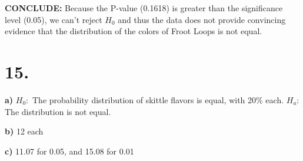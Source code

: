 \documentclass{article}
\begin{document}
\noindent\textbf{CONCLUDE:} Because the P-value (0.1618) is greater than the significance level (0.05), we can't reject $H_0$ and thus the data does not provide convincing evidence that the distribution of the colors of Froot Loops is not equal.

\section*{15.}

\noindent\textbf{a)} $H_0:$ The probability distribution of skittle flavors is equal, with 20\% each. $H_a:$ The distribution is not equal.

\noindent\textbf{b)} 12 each

\noindent\textbf{c)} 11.07 for 0.05, and 15.08 for 0.01
\end{document}
